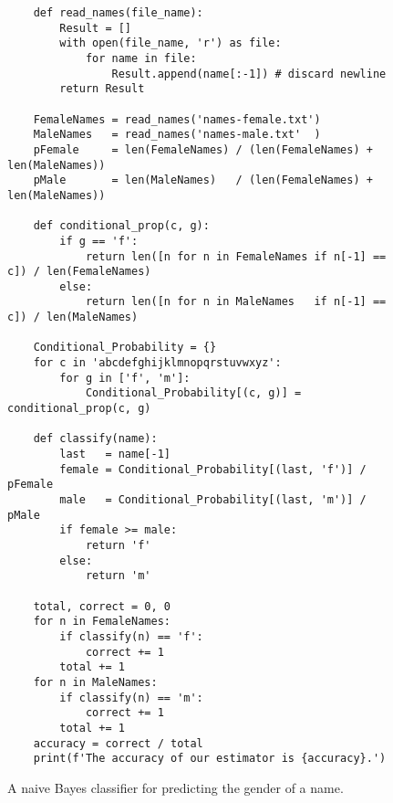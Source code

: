 \begin{figure}[!ht]
\centering
\begin{verbatim}
    def read_names(file_name):
        Result = []
        with open(file_name, 'r') as file:
            for name in file:
                Result.append(name[:-1]) # discard newline
        return Result
    
    FemaleNames = read_names('names-female.txt')
    MaleNames   = read_names('names-male.txt'  )
    pFemale     = len(FemaleNames) / (len(FemaleNames) + len(MaleNames))
    pMale       = len(MaleNames)   / (len(FemaleNames) + len(MaleNames))
    
    def conditional_prop(c, g):
        if g == 'f':
            return len([n for n in FemaleNames if n[-1] == c]) / len(FemaleNames)
        else:
            return len([n for n in MaleNames   if n[-1] == c]) / len(MaleNames)
    
    Conditional_Probability = {}
    for c in 'abcdefghijklmnopqrstuvwxyz':
        for g in ['f', 'm']:
            Conditional_Probability[(c, g)] = conditional_prop(c, g)
    
    def classify(name):
        last   = name[-1]
        female = Conditional_Probability[(last, 'f')] / pFemale
        male   = Conditional_Probability[(last, 'm')] / pMale
        if female >= male:
            return 'f'
        else:
            return 'm'
        
    total, correct = 0, 0
    for n in FemaleNames:
        if classify(n) == 'f':
            correct += 1
        total += 1
    for n in MaleNames:
        if classify(n) == 'm':
            correct += 1
        total += 1
    accuracy = correct / total
    print(f'The accuracy of our estimator is {accuracy}.')
\end{verbatim}

\caption{A naive Bayes classifier for predicting the gender of a name.}
\label{fig:gender_prediction.py}
\end{figure}

